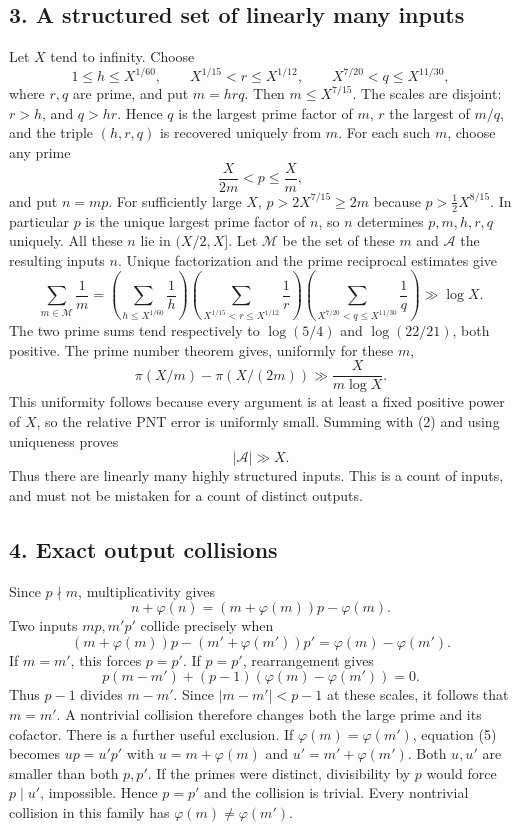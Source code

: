 \subsection*{3. A structured set of linearly many inputs}
Let $X$ tend to infinity. Choose
\[
 1\le h\le X^{1/60},\qquad
 X^{1/15}<r\le X^{1/12},\qquad
 X^{7/20}<q\le X^{11/30},
\]
where $r,q$ are prime, and put $m=hrq$. Then $m\le X^{7/15}$. The scales are disjoint: $r>h$, and $q>hr$. Hence $q$ is the largest prime factor of $m$, $r$ the largest of $m/q$, and the triple $(h,r,q)$ is recovered uniquely from $m$.
For each such $m$, choose any prime
\[
 \frac{X}{2m}<p\le\frac Xm,
\]
and put $n=mp$. For sufficiently large $X$, $p>2X^{7/15}\ge2m$ because $p>\tfrac12X^{8/15}$. In particular $p$ is the unique largest prime factor of $n$, so $n$ determines $p,m,h,r,q$ uniquely. All these $n$ lie in $(X/2,X]$.
Let $\mathcal M$ be the set of these $m$ and $\mathcal A$ the resulting inputs $n$. Unique factorization and the prime reciprocal estimates give
\[
 \sum_{m\in\mathcal M}\frac1m
 =\left(\sum_{h\le X^{1/60}}\frac1h\right)
  \left(\sum_{X^{1/15}<r\le X^{1/12}}\frac1r\right)
  \left(\sum_{X^{7/20}<q\le X^{11/30}}\frac1q\right)
 \gg\log X.                                             \tag{2}
\]
The two prime sums tend respectively to $\log(5/4)$ and $\log(22/21)$, both positive. The prime number theorem gives, uniformly for these $m$,
\[
 \pi(X/m)-\pi(X/(2m))\gg\frac{X}{m\log X}.
\]
This uniformity follows because every argument is at least a fixed positive power of $X$, so the relative PNT error is uniformly small. Summing with (2) and using uniqueness proves
\[
 |\mathcal A|\gg X.                                      \tag{3}
\]
Thus there are linearly many highly structured inputs. This is a count of inputs, and must not be mistaken for a count of distinct outputs.
\subsection*{4. Exact output collisions}
Since $p\nmid m$, multiplicativity gives
\[
 n+\varphi(n)=(m+\varphi(m))p-\varphi(m).                 \tag{4}
\]
Two inputs $mp,m'p'$ collide precisely when
\[
 (m+\varphi(m))p-(m'+\varphi(m'))p'
       =\varphi(m)-\varphi(m').                          \tag{5}
\]
If $m=m'$, this forces $p=p'$. If $p=p'$, rearrangement gives
\[
 p(m-m')+(p-1)(\varphi(m)-\varphi(m'))=0.
\]
Thus $p-1$ divides $m-m'$. Since $|m-m'|<p-1$ at these scales, it follows that $m=m'$. A nontrivial collision therefore changes both the large prime and its cofactor.
There is a further useful exclusion. If $\varphi(m)=\varphi(m')$, equation (5) becomes $up=u'p'$ with $u=m+\varphi(m)$ and $u'=m'+\varphi(m')$. Both $u,u'$ are smaller than both $p,p'$. If the primes were distinct, divisibility by $p$ would force $p\mid u'$, impossible. Hence $p=p'$ and the collision is trivial. Every nontrivial collision in this family has $\varphi(m)\ne\varphi(m')$.
